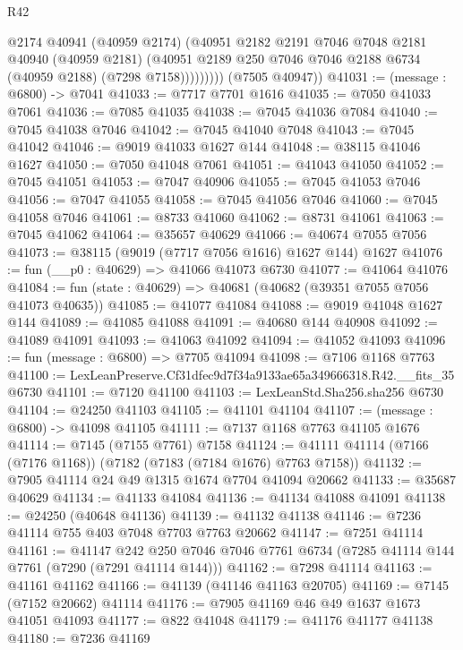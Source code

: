 \begin{lexlean}{R42}
\begin{coremodule}
{                  @2174
                  @40941
                  (@40959 @2174)
                  (@40951
                    @2182
                    @2191
                    @7046
                    @7048
                    @2181
                    @40940
                    (@40959 @2181)
                    (@40951 @2189 @250 @7046 @7046 @2188 @6734 (@40959 @2188) (@7298 @7158)))))))))
      (@7505 @40947))
@41031 := (message : @6800) -> @7041
@41033 := @7717 @7701 @1616
@41035 := @7050 @41033 @7061
@41036 := @7085 @41035
@41038 := @7045 @41036 @7084
@41040 := @7045 @41038 @7046
@41042 := @7045 @41040 @7048
@41043 := @7045 @41042
@41046 := @9019 @41033 @1627 @144
@41048 := @38115 @41046 @1627
@41050 := @7050 @41048 @7061
@41051 := @41043 @41050
@41052 := @7045 @41051
@41053 := @7047 @40906
@41055 := @7045 @41053 @7046
@41056 := @7047 @41055
@41058 := @7045 @41056 @7046
@41060 := @7045 @41058 @7046
@41061 := @8733 @41060
@41062 := @8731 @41061
@41063 := @7045 @41062
@41064 := @35657 @40629
@41066 := @40674 @7055 @7056
@41073 := @38115 (@9019 (@7717 @7056 @1616) @1627 @144) @1627
@41076 := fun (__p0 : @40629) => @41066 @41073 @6730
@41077 := @41064 @41076
@41084 := fun (state : @40629) => @40681 (@40682 (@39351 @7055 @7056 @41073 @40635))
@41085 := @41077 @41084
@41088 := @9019 @41048 @1627 @144
@41089 := @41085 @41088
@41091 := @40680 @144 @40908
@41092 := @41089 @41091
@41093 := @41063 @41092
@41094 := @41052 @41093
@41096 := fun (message : @6800) => @7705 @41094
@41098 := @7106 @1168 @7763
@41100 := LexLeanPreserve.Cf31dfec9d7f34a9133ae65a349666318.R42.__fits_35 @6730
@41101 := @7120 @41100
@41103 := LexLeanStd.Sha256.sha256 @6730
@41104 := @24250 @41103
@41105 := @41101 @41104
@41107 := (message : @6800) -> @41098 @41105
@41111 := @7137 @1168 @7763 @41105 @1676
@41114 := @7145 (@7155 @7761) @7158
@41124 := @41111 @41114 (@7166 (@7176 @1168)) (@7182 (@7183 (@7184 @1676) @7763 @7158))
@41132 := @7905 @41114 @24 @49 @1315 @1674 @7704 @41094 @20662
@41133 := @35687 @40629
@41134 := @41133 @41084
@41136 := @41134 @41088 @41091
@41138 := @24250 (@40648 @41136)
@41139 := @41132 @41138
@41146 := @7236 @41114 @755 @403 @7048 @7703 @7763 @20662
@41147 := @7251 @41114
@41161 := @41147
    @242
    @250
    @7046
    @7046
    @7761
    @6734
    (@7285 @41114 @144 @7761 (@7290 (@7291 @41114 @144)))
@41162 := @7298 @41114
@41163 := @41161 @41162
@41166 := @41139 (@41146 @41163 @20705)
@41169 := @7145 (@7152 @20662) @41114
@41176 := @7905 @41169 @46 @49 @1637 @1673 @41051 @41093
@41177 := @822 @41048
@41179 := @41176 @41177 @41138
@41180 := @7236 @41169
}
\end{coremodule}
\end{lexlean}

